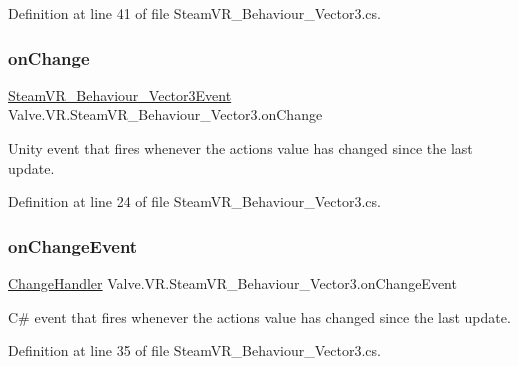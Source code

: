Definition at line 41 of file Steam\+V\+R\+\_\+\+Behaviour\+\_\+\+Vector3.\+cs.

\mbox{\label{class_valve_1_1_v_r_1_1_steam_v_r___behaviour___vector3_a10ba307be191067a0432ea3ec0d09840}} 
\subsubsection{\texorpdfstring{onChange}{onChange}}
{\footnotesize\ttfamily \mbox{\hyperlink{class_valve_1_1_v_r_1_1_steam_v_r___behaviour___vector3_event}{Steam\+V\+R\+\_\+\+Behaviour\+\_\+\+Vector3\+Event}} Valve.\+V\+R.\+Steam\+V\+R\+\_\+\+Behaviour\+\_\+\+Vector3.\+on\+Change}



Unity event that fires whenever the action\textquotesingle{}s value has changed since the last update. 



Definition at line 24 of file Steam\+V\+R\+\_\+\+Behaviour\+\_\+\+Vector3.\+cs.

\mbox{\label{class_valve_1_1_v_r_1_1_steam_v_r___behaviour___vector3_ad0b0327bca19ec390c75a9e8f6170227}} 
\subsubsection{\texorpdfstring{onChangeEvent}{onChangeEvent}}
{\footnotesize\ttfamily \mbox{\hyperlink{class_valve_1_1_v_r_1_1_steam_v_r___behaviour___vector3_acbfc7493b7f3400ae86a1dc7a1d8eebd}{Change\+Handler}} Valve.\+V\+R.\+Steam\+V\+R\+\_\+\+Behaviour\+\_\+\+Vector3.\+on\+Change\+Event}



C\# event that fires whenever the action\textquotesingle{}s value has changed since the last update. 



Definition at line 35 of file Steam\+V\+R\+\_\+\+Behaviour\+\_\+\+Vector3.\+cs.

